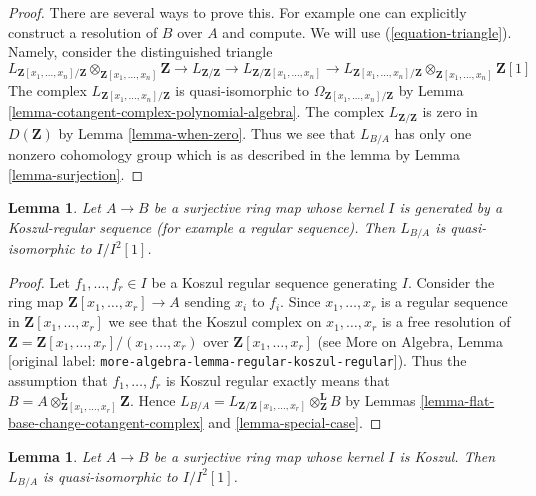 \documentclass[10pt,a4paper]{article}
\theoremstyle{plain}
\newtheorem{lemma}[subsection]{Lemma}
\theoremstyle{definition}
\theoremstyle{remark}
\numberwithin{equation}{subsection}
\begin{document}
\begin{proof}
There are several ways to prove this. For example one can explicitly construct
a resolution of $B$ over $A$ and compute. We will use (\ref{equation-triangle}).
Namely, consider the distinguished triangle
$$
L_{\mathbf{Z}[x_1, \ldots, x_n]/\mathbf{Z}}
\otimes_{\mathbf{Z}[x_1, \ldots, x_n]} \mathbf{Z} \to
L_{\mathbf{Z}/\mathbf{Z}} \to
L_{\mathbf{Z}/\mathbf{Z}[x_1, \ldots, x_n]}\to
L_{\mathbf{Z}[x_1, \ldots, x_n]/\mathbf{Z}}
\otimes_{\mathbf{Z}[x_1, \ldots, x_n]} \mathbf{Z}[1]
$$
The complex $L_{\mathbf{Z}[x_1, \ldots, x_n]/\mathbf{Z}}$
is quasi-isomorphic to $\Omega_{\mathbf{Z}[x_1, \ldots, x_n]/\mathbf{Z}}$ by
Lemma \ref{lemma-cotangent-complex-polynomial-algebra}.
The complex $L_{\mathbf{Z}/\mathbf{Z}}$ is zero in $D(\mathbf{Z})$ by
Lemma \ref{lemma-when-zero}.
Thus we see that $L_{B/A}$ has only one nonzero cohomology group
which is as described in the lemma by Lemma \ref{lemma-surjection}.
\end{proof}

\begin{lemma}
\label{lemma-mod-regular-sequence}
Let $A \to B$ be a surjective ring map whose kernel $I$ is generated
by a Koszul-regular sequence (for example a regular sequence).
Then $L_{B/A}$ is quasi-isomorphic to $I/I^2[1]$.
\end{lemma}

\begin{proof}
Let $f_1, \ldots, f_r \in I$ be a Koszul regular sequence generating $I$.
Consider the ring map $\mathbf{Z}[x_1, \ldots, x_r] \to A$ sending
$x_i$ to $f_i$. Since $x_1, \ldots, x_r$ is a regular sequence in
$\mathbf{Z}[x_1, \ldots, x_r]$ we see that the Koszul complex
on $x_1, \ldots, x_r$ is a free resolution of
$\mathbf{Z} = \mathbf{Z}[x_1, \ldots, x_r]/(x_1, \ldots, x_r)$
over $\mathbf{Z}[x_1, \ldots, x_r]$
(see More on Algebra, Lemma \textnormal{[original label: \nolinkurl{more-algebra-lemma-regular-koszul-regular}]}).
Thus the assumption that $f_1, \ldots, f_r$ is Koszul regular
exactly means that
$B = A \otimes_{\mathbf{Z}[x_1, \ldots, x_r]}^\mathbf{L} \mathbf{Z}$.
Hence
$L_{B/A} = L_{\mathbf{Z}/\mathbf{Z}[x_1, \ldots, x_r]}
\otimes_\mathbf{Z}^\mathbf{L} B$ by
Lemmas \ref{lemma-flat-base-change-cotangent-complex} and
\ref{lemma-special-case}.
\end{proof}

\begin{lemma}
\label{lemma-mod-Koszul-regular-ideal}
Let $A \to B$ be a surjective ring map whose kernel $I$ is Koszul.
Then $L_{B/A}$ is quasi-isomorphic to $I/I^2[1]$.
\end{lemma}
\end{document}
